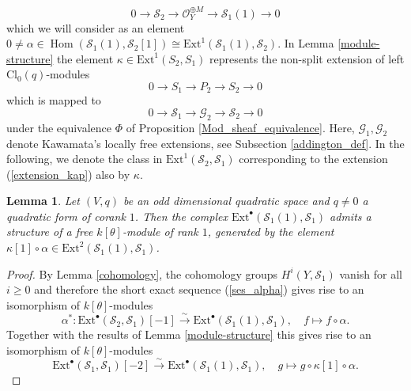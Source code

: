 \documentclass[a4paper, twoside, 11pt]{amsart}
\newtheorem{lemma}[theorem]{Lemma}
\theoremstyle{definition}
\theoremstyle{remark}
\numberwithin{equation}{theorem}
\DeclareMathOperator{\Hom}{Hom}
\newcommand{\evencl}{\mathrm{Cl}_0}
\begin{document}
	\begin{equation}\label{ses_alpha}
		0 \longrightarrow \mathcal{S}_2 \longrightarrow \mathcal{O}_Y^{\oplus M} \longrightarrow \mathcal{S}_1(1)\longrightarrow 0 
	\end{equation}
    which we will consider as an element $0\neq \alpha \in \Hom(\mathcal{S}_1(1), \mathcal{S}_2[1]) \cong \mathrm{Ext}^{1}(\mathcal{S}_1(1), \mathcal{S}_2)$. 
    In Lemma \ref{module-structure} the element $\kappa \in \mathrm{Ext}^1(S_2, S_1)$ represents the non-split extension of left $\evencl(q)$-modules
    \begin{equation}
        0 \longrightarrow S_1 \longrightarrow P_2 \longrightarrow S_2 \longrightarrow 0
    \end{equation}
    which is mapped to
    \begin{equation}\label{extension_kap}
        0 \longrightarrow \mathcal{S}_1 \longrightarrow \mathcal{G}_2 \longrightarrow \mathcal{S}_2 \longrightarrow 0
    \end{equation}
    under the equivalence $\Phi$ of Proposition \ref{Mod_sheaf_equivalence}. Here, $\mathcal{G}_1, \mathcal{G}_2$ denote Kawamata's locally free extensions, see Subsection \ref{addington_def}.
    In the following, we denote the class in $\mathrm{Ext}^1(\mathcal{S}_2,\mathcal{S}_1)$ corresponding to the extension (\ref{extension_kap}) also by $\kappa$.
\begin{lemma}\label{module_structure_twist}
    Let $(V,q)$ be an odd dimensional quadratic space and $q\neq 0$ a quadratic form of corank $1$. Then the complex $\mathrm{Ext}^{\bullet}(\mathcal{S}_1(1), \mathcal{S}_1)$ admits a structure of a free $k[\theta]$-module of rank $1$, generated by the element $\kappa[1] \circ \alpha \in \mathrm{Ext}^2(\mathcal{S}_1(1), \mathcal{S}_1)$.
\end{lemma}
\begin{proof}
    By Lemma \ref{cohomology}, the cohomology groups $H^i(Y, \mathcal{S}_1)$ vanish for all $i \geq 0$ and therefore the short exact sequence (\ref{ses_alpha}) gives rise to an isomorphism of $k[\theta]$-modules 
	\begin{equation*}
		\alpha^*\colon \mathrm{Ext}^{\bullet}(\mathcal{S}_2, \mathcal{S}_1)[-1]\overset{\sim}{\longrightarrow}\mathrm{Ext}^{\bullet}(\mathcal{S}_1(1), \mathcal{S}_1), \quad f \mapsto f\circ \alpha.
	\end{equation*}
    Together with the results of Lemma \ref{module-structure} this gives rise to an isomorphism of $k[\theta]$-modules
    \begin{equation}\label{k_theta_module_twist}
        \mathrm{Ext}^{\bullet}(\mathcal{S}_1, \mathcal{S}_1)[-2]\overset{\sim}{\longrightarrow}\mathrm{Ext}^{\bullet}(\mathcal{S}_1(1), \mathcal{S}_1), \quad g \longmapsto g \circ \kappa[1] \circ \alpha.
    \end{equation}
\end{proof}
\end{document}
